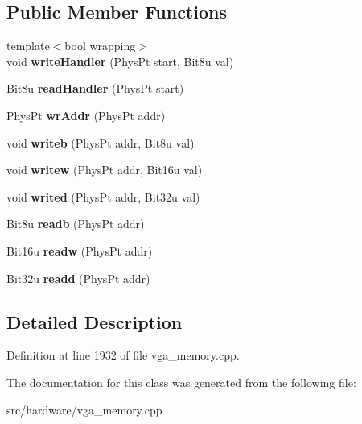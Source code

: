 \subsection*{Public Member Functions}
\begin{DoxyCompactItemize}
\item 
\hypertarget{classVGA__AMS__Handler_aeb0a1c400b9162e4e5e48bf0905d4865}{{\footnotesize template$<$bool wrapping$>$ }\\void {\bfseries write\-Handler} (Phys\-Pt start, Bit8u val)}\label{classVGA__AMS__Handler_aeb0a1c400b9162e4e5e48bf0905d4865}

\item 
\hypertarget{classVGA__AMS__Handler_a5661278164e2d7259ee9c8fe4c35d6df}{Bit8u {\bfseries read\-Handler} (Phys\-Pt start)}\label{classVGA__AMS__Handler_a5661278164e2d7259ee9c8fe4c35d6df}

\item 
\hypertarget{classVGA__AMS__Handler_a63b72ffd104220eb928c683bae72def3}{Phys\-Pt {\bfseries wr\-Addr} (Phys\-Pt addr)}\label{classVGA__AMS__Handler_a63b72ffd104220eb928c683bae72def3}

\item 
\hypertarget{classVGA__AMS__Handler_a885c0657d2d7ffd724b54fb5ab559fab}{void {\bfseries writeb} (Phys\-Pt addr, Bit8u val)}\label{classVGA__AMS__Handler_a885c0657d2d7ffd724b54fb5ab559fab}

\item 
\hypertarget{classVGA__AMS__Handler_a5ca68f0673d75103b87d5919b19b4b8d}{void {\bfseries writew} (Phys\-Pt addr, Bit16u val)}\label{classVGA__AMS__Handler_a5ca68f0673d75103b87d5919b19b4b8d}

\item 
\hypertarget{classVGA__AMS__Handler_ae1631976a85931c1a0a3dd6a4ec68b4c}{void {\bfseries writed} (Phys\-Pt addr, Bit32u val)}\label{classVGA__AMS__Handler_ae1631976a85931c1a0a3dd6a4ec68b4c}

\item 
\hypertarget{classVGA__AMS__Handler_a71185515db1bd0eba10316c09bfc54e9}{Bit8u {\bfseries readb} (Phys\-Pt addr)}\label{classVGA__AMS__Handler_a71185515db1bd0eba10316c09bfc54e9}

\item 
\hypertarget{classVGA__AMS__Handler_a9d850f1c8384f59762fe0e380bc5d90b}{Bit16u {\bfseries readw} (Phys\-Pt addr)}\label{classVGA__AMS__Handler_a9d850f1c8384f59762fe0e380bc5d90b}

\item 
\hypertarget{classVGA__AMS__Handler_a4aaa96ce06e4f5d451dcfb2e8522d082}{Bit32u {\bfseries readd} (Phys\-Pt addr)}\label{classVGA__AMS__Handler_a4aaa96ce06e4f5d451dcfb2e8522d082}

\end{DoxyCompactItemize}


\subsection{Detailed Description}


Definition at line 1932 of file vga\-\_\-memory.\-cpp.



The documentation for this class was generated from the following file\-:\begin{DoxyCompactItemize}
\item 
src/hardware/vga\-\_\-memory.\-cpp\end{DoxyCompactItemize}
